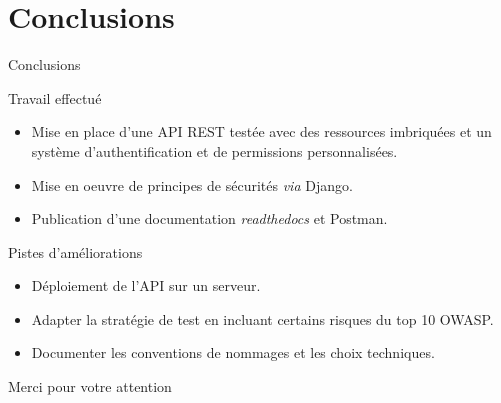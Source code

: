 \section{Conclusions}

\begin{frame}{Conclusions}
  \begin{block}{Travail effectué}
    \begin{itemize}
    \item Mise en place d'une API REST testée avec des ressources imbriquées et
      un système d'authentification et de permissions personnalisées.
    \item Mise en oeuvre de principes de sécurités \textit{via} Django.
    \item Publication d'une documentation \textit{readthedocs} et
      Postman.
    \end{itemize}
  \end{block}

  \begin{block}{Pistes d'améliorations}
    \begin{itemize}
    \item Déploiement de l'API sur un serveur.
    \item Adapter la stratégie de test en incluant certains
      risques du top 10 OWASP.
    \item Documenter les conventions de nommages et les choix
      techniques.      
    \end{itemize}
  \end{block}
\end{frame}

\begin{frame}{Merci pour votre attention}
  \tableofcontents
\end{frame}
